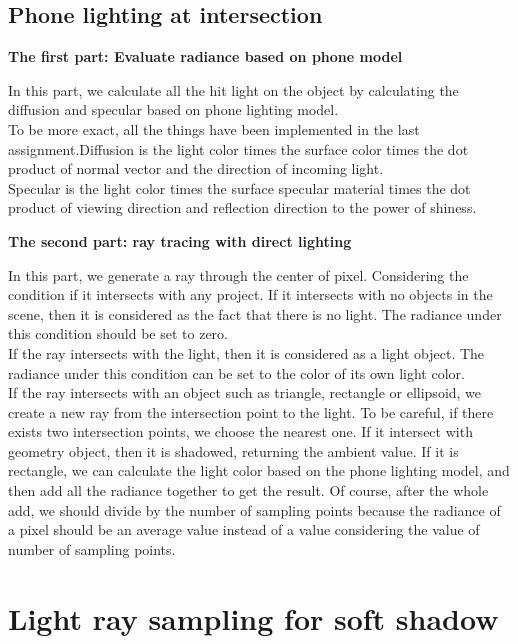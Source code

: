 \documentclass[acmtog]{acmart}
\begin{document}
\subsection{Phone lighting at intersection}

\textbf{The first part: Evaluate radiance based on phone model}

In this part, we calculate all the hit light on the object by calculating the diffusion and specular based on phone lighting model. \\
To be more exact, all the things have been implemented in the last assignment.Diffusion is the light color times the surface color times the dot product of normal vector and the direction of incoming light. \\
Specular is the light color times the surface specular material times the dot product of viewing direction and reflection direction to the power of shiness.

\textbf{The second part: ray tracing with direct lighting}

In this part, we generate a ray through the center of pixel. Considering the condition if it intersects with any project. If it intersects with no objects in the scene, then it is considered as the fact that there is no light. The radiance under this condition should be set to zero. \\
If the ray intersects with the light, then it is considered as a light object. The radiance under this condition can be set to the color of its own light color. \\
If the ray intersects with an object such as triangle, rectangle or ellipsoid, we create a new ray from the intersection point to the light. To be careful, if there exists two intersection points, we choose the nearest one. If it intersect with geometry object, then it is shadowed, returning the ambient value. If it is rectangle, we can calculate the light color based on the phone lighting model, and then add all the radiance together to get the result. Of course, after the whole add, we should divide by the number of sampling points because the radiance of a pixel should be an average value instead of a value considering the value of number of sampling points. \\

\section{Light ray sampling for soft shadow}
\end{document}
